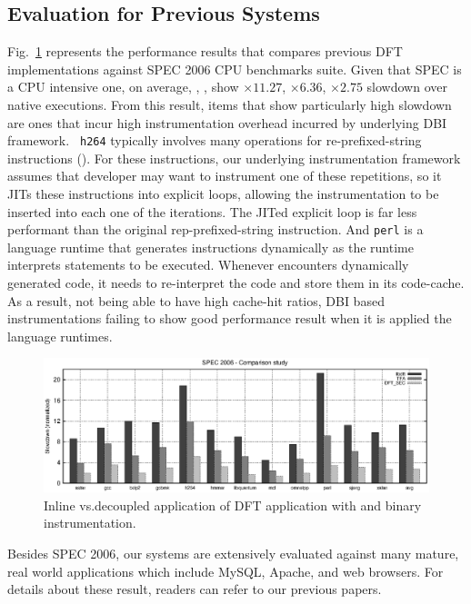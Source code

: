 \subsection{Evaluation for Previous Systems}
\label{ssec:prev_eval}

Fig.~\ref{fig:s2k6} represents the performance results that compares previous
DFT implementations against SPEC 2006 CPU benchmarks suite. Given that SPEC is
a CPU intensive one, on average, \libdft, \tfa, \sreplica show $\times 11.27$,
$\times 6.36$, $\times 2.75$ slowdown over native executions.
%
From this result, items that show particularly high slowdown are ones that
incur high instrumentation overhead incurred by underlying DBI framework. {\tt
h264} typically involves many operations for re-prefixed-string instructions
(). For these instructions, our
underlying instrumentation framework \ie \pin assumes that developer may want
to instrument one of these repetitions, so it JITs these instructions into
explicit loops, allowing the instrumentation to be inserted into each one of
the iterations. The JITed explicit loop is far less performant than the
original rep-prefixed-string instruction. 
%
And {\tt perl} is a language runtime that generates instructions dynamically as
the runtime interprets statements to be executed. Whenever \pin encounters
dynamically generated code, it needs to re-interpret the code and store them in
its code-cache. As a result, not being able to have high cache-hit ratios, DBI
based instrumentations failing to show good performance result when it is
applied the language runtimes. 

\begin{figure}[tb]
    \centering
    \includegraphics[width=\linewidth]{figs/s2k6.eps}
    \caption{Inline vs.decoupled application of DFT application with \sreplica
    and binary instrumentation.\label{fig:s2k6}}
\end{figure}

Besides SPEC 2006, our systems are extensively evaluated against many mature,
real world applications which include MySQL, Apache, and web browsers. For
details about these result, readers can refer to our previous papers.

